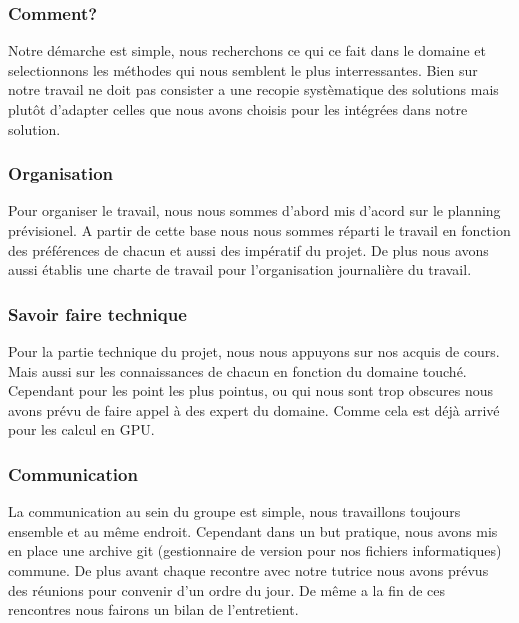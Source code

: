 \documentclass[a4paper,10pt]{article}
\begin{document}
\subsubsection{Comment?}
Notre démarche est simple, nous recherchons ce qui ce fait dans le
domaine et selectionnons les méthodes qui nous semblent le plus
interressantes. Bien sur notre travail ne doit pas consister a une
recopie systèmatique des solutions mais plutôt d'adapter celles que
nous avons choisis pour les intégrées dans notre solution.\\

\subsubsection{Organisation}
Pour organiser le travail, nous nous sommes d'abord mis d'acord sur le
planning prévisionel. A partir de cette base nous nous sommes réparti
le travail en fonction des préférences de chacun et aussi des
impératif du projet. De plus nous avons aussi établis une charte de
travail pour l'organisation journalière du travail.\\

\subsubsection{Savoir faire technique}
Pour la partie technique du projet, nous nous appuyons sur nos acquis
de cours. Mais aussi sur les connaissances de chacun en fonction du
domaine touché.\\ Cependant pour les point les plus pointus, ou qui
nous sont trop obscures nous avons prévu de faire appel à des expert
du domaine. Comme cela est déjà arrivé pour les calcul en GPU.

\subsubsection{Communication}
La communication au sein du groupe est simple, nous travaillons
toujours ensemble et au même endroit. Cependant dans un but pratique,
nous avons mis en place une archive git (gestionnaire de version pour
nos fichiers informatiques) commune. De plus avant chaque recontre
avec notre tutrice nous avons prévus des réunions pour convenir d'un
ordre du jour. De même a la fin de ces rencontres nous fairons un
bilan de l'entretient.

\end{document}

